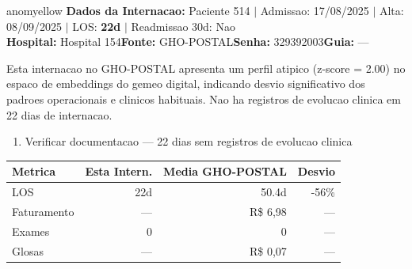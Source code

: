 \documentclass[a4paper,10pt]{article}
\begin{document}
\begin{anomalycard}[Internacao 63 | GHO-POSTAL | MODERADO (z=2.00)]{anomyellow}
\textbf{Dados da Internacao:} Paciente 514 $\mid$ Admissao: 17/08/2025 $\mid$ Alta: 08/09/2025 $\mid$ LOS: \textbf{22d} $\mid$ Readmissao 30d: Nao\\
\textbf{Hospital:} Hospital 154\quad\textbf{Fonte:} GHO-POSTAL\quad\textbf{Senha:} 329392003\quad\textbf{Guia:} ---\\
\vspace{2pt}\begin{tcolorbox}[colback=severityred!20,colframe=anomyellow,title={\textbf{Interpretacao de Negocio}},fonttitle=\bfseries\small,left=4pt,right=4pt,top=3pt,bottom=3pt]
{\small Esta internacao no GHO-POSTAL apresenta um perfil atipico (z-score = 2.00) no espaco de embeddings do gemeo digital, indicando desvio significativo dos padroes operacionais e clinicos habituais. Nao ha registros de evolucao clinica em 22 dias de internacao.}
\end{tcolorbox}
\begin{tcolorbox}[colback=severityyellow!30,colframe=anomorange,title={\textbf{Recomendacoes Especificas}},fonttitle=\bfseries\small,left=4pt,right=4pt,top=3pt,bottom=3pt]
\begin{enumerate}[nosep,leftmargin=16pt]
\item {\small Verificar documentacao --- 22 dias sem registros de evolucao clinica}
\end{enumerate}
\end{tcolorbox}
\begin{center}\begin{tabular}{l r r r}\toprule\textbf{Metrica} & \textbf{Esta Intern.} & \textbf{Media GHO-POSTAL} & \textbf{Desvio} \\\midrule
LOS & 22d & 50.4d & -56\% \\
Faturamento & --- & R\$ 6,98 & --- \\
Exames & 0 & 0 & --- \\
Glosas & --- & R\$ 0,07 & --- \\
\bottomrule\end{tabular}\end{center}


\end{anomalycard}
\end{document}
